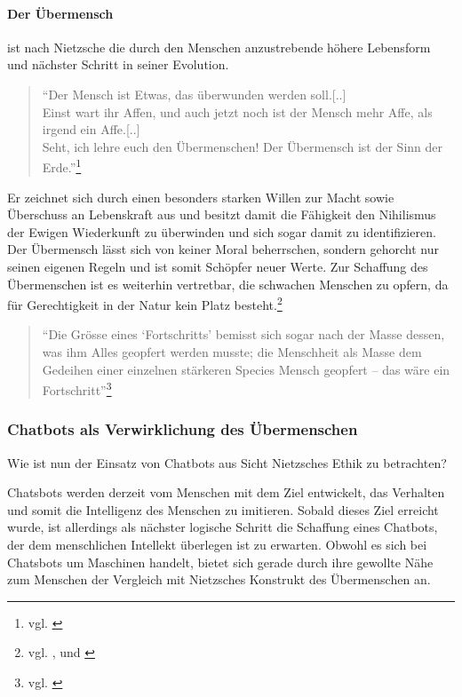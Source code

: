 \paragraph{Der Übermensch} ist nach Nietzsche die durch den Menschen anzustrebende höhere Lebensform und nächster Schritt in seiner Evolution.
\begin{quote}
\enquote{Der Mensch ist Etwas, das überwunden werden soll.[..]\\
Einst wart ihr Affen, und auch jetzt noch ist der Mensch mehr Affe, als irgend ein Affe.[..]\\
Seht, ich lehre euch den Übermenschen! Der Übermensch ist der Sinn der Erde.}\footnote{vgl. \cite{Nietzsche8}}
\end{quote}
Er zeichnet sich durch einen besonders starken Willen zur Macht sowie Überschuss an Lebenskraft aus und besitzt damit die Fähigkeit den Nihilismus der Ewigen Wiederkunft zu überwinden und sich sogar damit zu identifizieren.
Der Übermensch lässt sich von keiner Moral beherrschen, sondern gehorcht nur seinen eigenen Regeln und ist somit Schöpfer neuer Werte.
Zur Schaffung des Übermenschen ist es weiterhin vertretbar, die schwachen Menschen zu opfern, da für Gerechtigkeit in der Natur kein Platz besteht.\footnote{vgl. \cite{Nietzsche9}, \cite{Nietzsche10} und \cite{Nietzsche1}}
\begin{quote}
\enquote{Die Grösse eines \enquote{Fortschritts} bemisst sich sogar nach der Masse dessen, was ihm Alles geopfert werden musste; die Menschheit als Masse dem Gedeihen einer einzelnen stärkeren Species Mensch geopfert – das wäre ein Fortschritt}\footnote{vgl. \cite{Nietzsche11}}
\end{quote}

\subsubsection{Chatbots als Verwirklichung des Übermenschen}
Wie ist nun der Einsatz von Chatbots aus Sicht Nietzsches Ethik zu betrachten?

Chatsbots werden derzeit vom Menschen mit dem Ziel entwickelt, das Verhalten und somit die Intelligenz des Menschen zu imitieren. 
Sobald dieses Ziel erreicht wurde, ist allerdings als nächster logische Schritt die Schaffung eines Chatbots, der dem menschlichen Intellekt überlegen ist zu erwarten. 
Obwohl es sich bei Chatsbots um Maschinen handelt, bietet sich gerade durch ihre gewollte Nähe zum Menschen der Vergleich mit Nietzsches Konstrukt des Übermenschen an.

